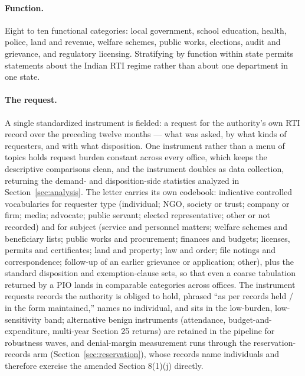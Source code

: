 \documentclass[11pt]{article}
\begin{document}
\paragraph{Function.} Eight to ten functional categories: local government, school education, health, police, land and revenue, welfare schemes, public works, elections, audit and grievance, and regulatory licensing. Stratifying by function within state permits statements about the Indian RTI regime rather than about one department in one state.

\paragraph{The request.} A single standardized instrument is fielded: a request for the authority's own RTI record over the preceding twelve months --- what was asked, by what kinds of requesters, and with what disposition. One instrument rather than a menu of topics holds request burden constant across every office, which keeps the descriptive comparisons clean, and the instrument doubles as data collection, returning the demand- and disposition-side statistics analyzed in Section~\ref{sec:analysis}. The letter carries its own codebook: indicative controlled vocabularies for requester type (individual; NGO, society or trust; company or firm; media; advocate; public servant; elected representative; other or not recorded) and for subject (service and personnel matters; welfare schemes and beneficiary lists; public works and procurement; finances and budgets; licenses, permits and certificates; land and property; law and order; file notings and correspondence; follow-up of an earlier grievance or application; other), plus the standard disposition and exemption-clause sets, so that even a coarse tabulation returned by a PIO lands in comparable categories across offices. The instrument requests records the authority is obliged to hold, phrased ``as per records held / in the form maintained,'' names no individual, and sits in the low-burden, low-sensitivity band; alternative benign instruments (attendance, budget-and-expenditure, multi-year Section 25 returns) are retained in the pipeline for robustness waves, and denial-margin measurement runs through the reservation-records arm (Section~\ref{sec:reservation}), whose records name individuals and therefore exercise the amended Section 8(1)(j) directly.
\end{document}
